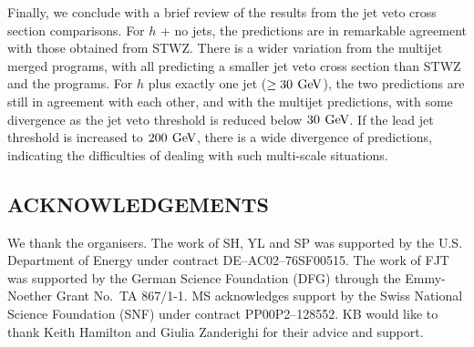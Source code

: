 Finally, we conclude with a brief review of the results from the jet veto 
cross section comparisons. For $h$ + no jets, the \hjetscompNNLOPS predictions are 
in remarkable agreement with those obtained from STWZ. There is a wider 
variation from the multijet merged programs, with all predicting a smaller 
jet veto cross section than STWZ and the \hjetscompNNLOPS programs. For $h$ plus 
exactly one jet ($\ge 30\,\text{\:GeV}$), the two \hjetscompNNLOPS predictions are still in 
agreement with each other, and with the multijet predictions, with some 
divergence as the jet veto threshold is reduced below $30 \,\text{\:GeV}$. If the 
lead jet threshold is increased to $200\,\text{\:GeV}$, there is a wide divergence 
of predictions, indicating the difficulties of dealing with such multi-scale 
situations. 


\subsection*{ACKNOWLEDGEMENTS}

We thank the organisers.
The work of SH, YL and SP was supported by the U.S. Department of Energy 
under contract DE--AC02--76SF00515.
The work of FJT was supported by the German Science Foundation (DFG) 
through the Emmy-Noether Grant No.\ TA 867/1-1. 
MS acknowledges support by the Swiss National Science Foundation (SNF) 
under contract PP00P2--128552. 
KB would like to thank Keith Hamilton and Giulia Zanderighi for their 
advice and support.

